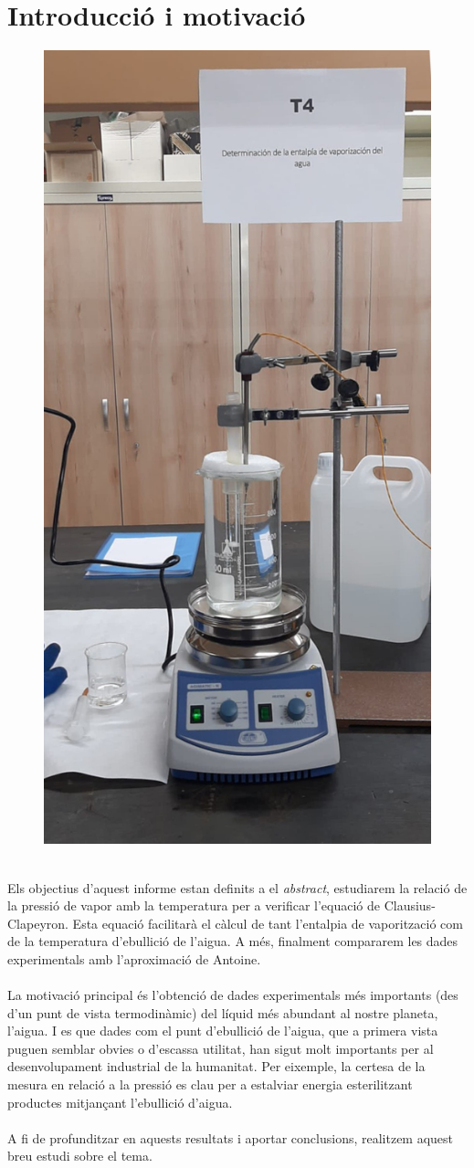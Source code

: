 \documentclass{article}
\begin{document}
\section{Introducció i motivació}
    \begin{figure}
        \centering
        \includegraphics[width=.26\textwidth]{fotos/portada.jpeg}
    \end{figure}

    \hfill{}\\
    Els objectius d'aquest informe estan definits a el {\textit{abstract}}, estudiarem la relació de la pressió de vapor amb la temperatura per a verificar l'equació de Clausius-Clapeyron. Esta equació facilitarà el càlcul de tant l'entalpia de vaporització com de la temperatura d'ebullició de l'aigua. A més, finalment compararem les dades experimentals amb l'aproximació de Antoine.\\ \\La motivació principal és l'obtenció de dades experimentals més importants (des d'un punt de vista termodinàmic) del líquid més abundant al nostre planeta, l'aigua. I es que dades com el punt d'ebullició de l'aigua, que a primera vista puguen semblar obvies o d'escassa utilitat, han sigut molt importants per al desenvolupament industrial de la humanitat. Per eixemple, la certesa de la mesura en relació a la pressió es clau per a estalviar energia esterilitzant productes mitjançant l'ebullició d'aigua.\\ \\A fi de profunditzar en aquests resultats i aportar conclusions, realitzem aquest breu estudi sobre el tema.
    \vspace{0.5cm}
\end{document}
